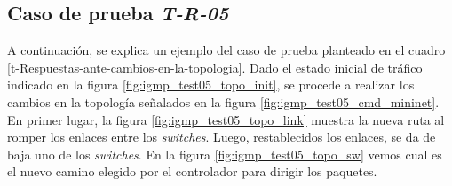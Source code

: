 \subsection*{Caso de prueba \textit{T-R-05}}

A continuación, se explica un ejemplo del caso de prueba planteado en el cuadro \ref{t-Respuestas-ante-cambios-en-la-topologia}. Dado el estado inicial de tráfico indicado en la figura \ref{fig:igmp_test05_topo_init}, se procede a realizar los cambios en la topología señalados en la figura \ref{fig:igmp_test05_cmd_mininet}. En primer lugar, la figura \ref{fig:igmp_test05_topo_link} muestra la nueva ruta al romper los enlaces entre los \textit{switches}. Luego, restablecidos los enlaces, se da de baja uno de los \textit{switches}. En la figura \ref{fig:igmp_test05_topo_sw} vemos cual es el nuevo camino elegido por el controlador para dirigir los paquetes. 

